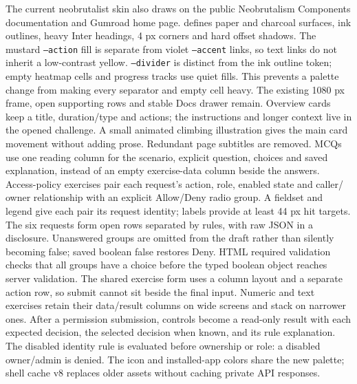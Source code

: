 The current neobrutalist skin also draws on the public Neobrutalism Components
documentation and Gumroad home page.  defines paper and charcoal
surfaces, ink outlines, heavy Inter headings, 4 px corners and hard offset shadows.
The mustard \texttt{--action} fill is separate from violet \texttt{--accent} links,
so text links do not inherit a low-contrast yellow. \texttt{--divider} is distinct
from the ink outline token; empty heatmap cells and progress tracks use quiet fills.
This prevents a palette change from making every separator and empty cell heavy.
The existing 1080 px frame, open supporting rows and stable Docs drawer remain.
Overview cards keep a title, duration/type and actions; the instructions and longer
context live in the opened challenge. A small animated climbing illustration gives
the main card movement without adding prose. Redundant page subtitles are removed.
MCQs use one reading column for the scenario, explicit question, choices and saved
explanation, instead of an empty exercise-data column beside the answers.
Access-policy exercises pair each request's action, role, enabled state and caller/
owner relationship with an explicit Allow/Deny radio group. A fieldset and legend
give each pair its request identity; labels provide at least 44 px hit targets.
The six requests form open rows separated by rules, with raw JSON in a disclosure.
Unanswered groups are omitted from the draft rather than silently becoming false;
saved boolean false restores Deny. HTML required validation checks that all groups
have a choice before the typed boolean object reaches server validation. The shared
exercise form uses a column layout and a separate action row, so submit cannot sit
beside the final input. Numeric and text exercises retain their data/result columns
on wide screens and stack on narrower ones.
After a permission submission, controls become a read-only result with each expected
decision, the selected decision when known, and its rule explanation. The disabled
identity rule is evaluated before ownership or role: a disabled owner/admin is denied.
The icon and installed-app colors share the new palette; shell cache v8 replaces
older assets without caching private API responses.

